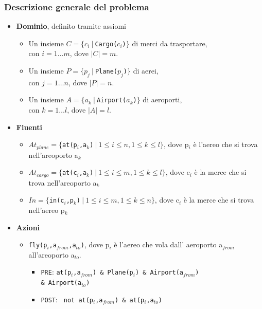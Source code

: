 \documentclass[a4paper,oneside,12pt]{book}
\begin{document}
    \subsubsection*{Descrizione generale del problema}
    \begin{itemize}
        \item \textbf{Dominio}, definito tramite assiomi
        \begin{itemize}
            \item Un insieme $C=\{c_i \ | \ $\texttt{Cargo($c_i$)}$\}$ di merci da trasportare,\\
            con $i=1 \dots m$, dove $|C|=m$.
            \item Un insieme $P=\{p_j \ | \ $\texttt{Plane($p_j$)}$\}$ di aerei,\\
            con $j=1 \dots n$, dove $|P|=n$.
            \item Un insieme $A=\{a_k \ | \ $\texttt{Airport($a_k$)}$\}$ di aeroporti,\\
            con $k=1 \dots l$, dove $|A|=l$.
        \end{itemize}
        \item \textbf{Fluenti}
        \begin{itemize}
            \item $At_{plane} = \{$\texttt{at(p$_i$,a$_k$)}$ \ | \ 1\leq i\leq n, 1 \leq k\leq l\}$,
            dove p$_i$ è l'aereo che si trova nell'areoporto a$_k$
            \item $At_{cargo}= \{$\texttt{at(c$_i$,a$_k$)}$  \ | \ 1\leq i\leq m, 1 \leq k\leq l\}$,
            dove c$_i$ è la merce che si trova nell'areoporto a$_k$
            \item $In= \{$\texttt{in(c$_i$,p$_k$)}$ \ | \ 1\leq i\leq m, 1 \leq k\leq n\}$,
            dove c$_i$ è la merce che si trova nell'aereo p$_k$
        \end{itemize}
        \item \textbf{Azioni}
        \begin{itemize}
            \item \texttt{fly(p$_i$,a$_{from}$,a$_{to}$)}, dove p$_i$ è l'aereo che vola dall'
            aeroporto a$_{from}$ all'areoporto a$_{to}$.
            \begin{itemize}
                \item \texttt{PRE}:
                \texttt{at(p$_i$,a$_{from}$) \& Plane(p$_i$) \& Airport(a$_{from}$)\\ \& Airport(a$_{to}$)}
                \item \texttt{POST}: \texttt{ not at(p$_i$,a$_{from}$) \& at(p$_i$,a$_{to}$)}

\end{itemize}
\end{itemize}
\end{itemize}
\end{document}
